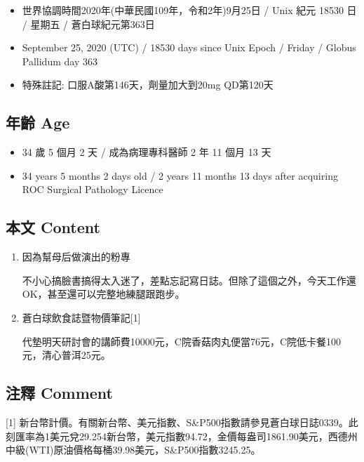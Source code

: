 \documentclass[
]{article}
\providecommand{\tightlist}{%
  \setlength{\itemsep}{0pt}\setlength{\parskip}{0pt}}
\begin{document}
\begin{itemize}
\tightlist
\item
  世界協調時間2020年(中華民國109年，令和2年)9月25日 / Unix 紀元 18530 日
  / 星期五 / 蒼白球紀元第363日
\item
  September 25, 2020 (UTC) / 18530 days since Unix Epoch / Friday /
  Globus Pallidum day 363
\item
  特殊註記: 口服A酸第146天，劑量加大到20mg QD第120天
\end{itemize}

\hypertarget{ux5e74ux9f61-age-24}{%
\subsection{年齡 Age}\label{ux5e74ux9f61-age-24}}

\begin{itemize}
\tightlist
\item
  34 歲 5 個月 2 天 / 成為病理專科醫師 2 年 11 個月 13 天
\item
  34 years 5 months 2 days old / 2 years 11 months 13 days after
  acquiring ROC Surgical Pathology Licence
\end{itemize}

\hypertarget{ux672cux6587-content-24}{%
\subsection{本文 Content}\label{ux672cux6587-content-24}}

\begin{enumerate}
\def\labelenumi{\arabic{enumi}.}
\item
  因為幫母后做演出的粉專

  不小心搞臉書搞得太入迷了，差點忘記寫日誌。但除了這個之外，今天工作還OK，甚至還可以完整地練腿跟跑步。
\item
  蒼白球飲食誌暨物價筆記{[}1{]}

  代墊明天研討會的講師費10000元，C院香菇肉丸便當76元，C院低卡餐100元，清心普洱25元。
\end{enumerate}

\hypertarget{ux6ce8ux91cb-comment-24}{%
\subsection{注釋 Comment}\label{ux6ce8ux91cb-comment-24}}

{[}1{]}
新台幣計價。有關新台幣、美元指數、S\&P500指數請參見蒼白球日誌0339。此刻匯率為1美元兌29.254新台幣，美元指數94.72，金價每盎司1861.90美元，西德州中級(WTI)原油價格每桶39.98美元，S\&P500指數3245.25。
\end{document}
